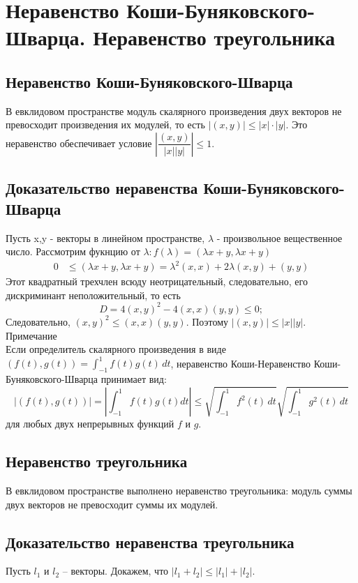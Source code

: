 \documentclass[12pt]{article}
\begin{document}
\section{Неравенство Коши-Буняковского-Шварца. Неравенство треугольника}
\subsection{Неравенство Коши-Буняковского-Шварца}
В евклидовом пространстве модуль скалярного произведения двух векторов не превосходит произведения их модулей, то есть  $|(x,y)| \leq |x| \cdot |y|$.  Это неравенство обеспечивает условие $\left|\dfrac{(x,y)}{|x||y|}\right| \leq 1$.

\subsection{Доказательство неравенства Коши-Буняковского-Шварца}
Пусть x,y - векторы в линейном пространстве, $\lambda$  - произвольное вещественное число. Рассмотрим фукнцию от $\lambda: f(\lambda)=(\lambda x+y,\lambda x+y)$
\begin{align*}
    0 & \leq (\lambda x + y, \lambda x + y)= \lambda^2 (x,x) + 2\lambda (x,y) + (y,y)
\end{align*}
Этот квадратный трехчлен всюду неотрицательный, следовательно, его дискриминант неположительный, то есть
$$D=4(x,y)^2-4(x,x)(y,y)\leq0;$$
Следовательно, $(x,y)^2\leq(x,x)(y,y)$.
Поэтому $|(x,y)| \leq |x||y|$.\\
Примечание \\
Если определитель скалярного произведения в виде $(f(t),g(t))=\int_{-1}^{1} f(t)g(t) \,dt$, неравенство Коши-Неравенство Коши-Буняковского-Шварца принимает вид:
$$|(f(t),g(t))| = \left|\int_{-1}^{1} f(t)g(t)dt\right| \leq \sqrt{\int_{-1}^{1} f^2(t)\,dt} \sqrt{\int_{-1}^{1} g^2(t)\,dt}$$
для любых двух непрерывных функций $f$ и $g$.

\subsection{Неравенство треугольника}
В евклидовом пространстве выполнено неравенство треугольника: модуль суммы двух векторов не превосходит суммы их модулей.

\subsection{Доказательство неравенства треугольника}
Пусть $l_1$ и $l_2$ – векторы.
Докажем, что $|l_1 + l_2| \leq |l_1|+|l_2|$.
\end{document}
